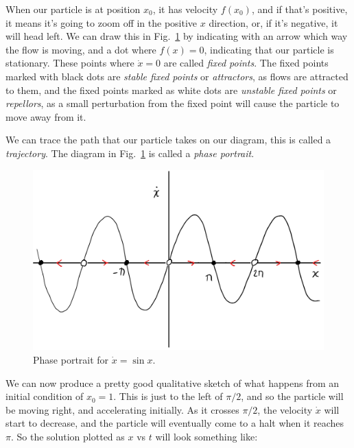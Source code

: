 When our particle is at position
$x_0$, it has velocity $f(x_0)$, and if that's positive, it means it's
going to zoom off in the positive $x$ direction, or, if it's negative, it
will head left. We can draw this in Fig.~\ref{fig:sinflow} by indicating
with an arrow which way the flow is moving, and a dot where $f(x) = 0$,
indicating that our particle is stationary. These points where $\dot x = 0$
are called \emph{fixed points}.  The fixed points marked with black dots
are \emph{stable fixed points} or \emph{attractors}, as flows are attracted
to them, and the fixed points marked as white dots are \emph{unstable fixed
points} or \emph{repellors}, as a small perturbation from the fixed point
will cause the particle to move away from it.

We can trace the path that our particle takes on our diagram, this is
called a \emph{trajectory}. The diagram in Fig.~\ref{fig:sinflow} is called
a \emph{phase portrait}.

\begin{figure}[h!]
  \centering
  \includegraphics[width=\linewidth]{figs/sinflow}
  \caption{Phase portrait for $\dot x = \sin x$.}
  \label{fig:sinflow}
\end{figure}

We can now produce a pretty good qualitative sketch of what happens from an
initial condition of $x_0 = 1$. This is just to the left of $\pi/2$, and so
the particle will be moving right, and accelerating initially. As it
crosses $\pi/2$, the velocity $\dot x$ will start to decrease, and the
particle will eventually come to a halt when it reaches $\pi$. So the
solution plotted as $x$ vs $t$ will look something like:

